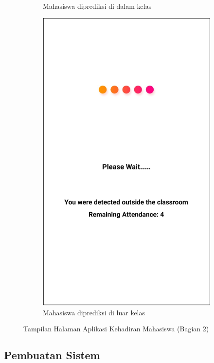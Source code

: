 \begin{enumerate}[a.]
\begin{figure} [H]
\begin{subfigure}{.5\textwidth}
			      \caption{Mahasiswa diprediksi di dalam kelas}
		      \end{subfigure}
		      \begin{subfigure}{.5\textwidth}
			      \centering
			      \includegraphics[width=.5\linewidth]{gambar/android/mahasiswa-8}
			      \caption{Mahasiswa diprediksi di luar kelas}
		      \end{subfigure}
		      \vspace{0.5cm}
		      \caption{Tampilan Halaman Aplikasi Kehadiran Mahasiswa (Bagian 2)}
		      \label{aplikasimahasiswabagian2}
	      \end{figure}


\end{enumerate}

\subsection{Pembuatan Sistem}

